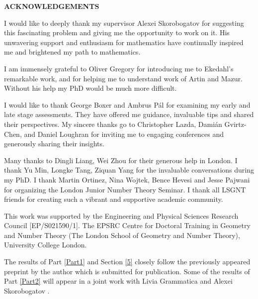 \documentclass[a4paper,12pt,twoside]{report}
\begin{document}
\newpage

\begin{flushright}
    \Huge{\bf ACKNOWLEDGEMENTS}
\end{flushright}

I would like to deeply thank my supervisor Alexei Skorobogatov 
for suggesting this fascinating problem and giving me the opportunity to work on it. 
His unwavering support and enthusiasm for mathematics have 
continually inspired me and brightened my path to mathematics.

I am immensely grateful to Oliver Gregory 
for introducing me to Ekedahl's remarkable work, 
and for helping me to understand work of Artin and Mazur. 
Without his help my PhD would be much more difficult.


I would like to thank George Boxer and Ambrus P\'al for examining my early 
and late stage assessments. 
They have offered me guidance, invaluable tips and shared their perspectives. 
My sincere thanks go to Christopher Lazda, Dami\'an Gvirtz-Chen, 
and Daniel Loughran for inviting me to engaging conferences 
and generously sharing their insights. 


Many thanks to Dingli Liang, Wei Zhou for their generous help in London.  
I thank Yu Min, Longke Tang, Ziquan Yang for the invaluable conversations during my PhD. 
I thank Martin Ortinez, Nina Wojtek, Bence Hevesi and Jesse Pajwani for 
organizing the London Junior Number Theory Seminar. 
I thank all LSGNT friends 
for creating such a vibrant and supportive academic community.

This work was supported by the Engineering and Physical Sciences Research Council [EP/S021590/1]. 
The EPSRC Centre for Doctoral Training in Geometry and Number Theory (The London School of Geometry and Number Theory), University College London.

\newpage
{} 
The results of Part \ref{Part1} and Section \ref{5} closely follow 
the previously appeared preprint by the author \cite{Yang} 
which is submitted for publication. 
Some of the results of Part \ref{Part2} will appear in a joint work with Livia Grammatica 
and Alexei Skorobogatov \cite{Skor}. 




\tableofcontents

\end{document}
